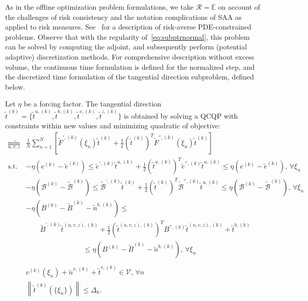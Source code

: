 \documentclass{article}
\newcommand{\1}{\mathds{1}}          %
\theoremstyle{definition}
\begin{document}
\begin{sloppypar}
As in the offline optimization problem formulations, we take $\mathcal{R}=\mathbb{E}$ on account of the challenges of risk consistency and the notation complications of SAA as applied to risk measures. See~\cite{kouri2016risk} for a description of risk-averse PDE-constrained problems. Observe that with the regularity of~\eqref{eq:subptrnormal}, this problem can be solved by computing the adjoint, and subsequently perform (potential adaptive) discretization methods. For comprehensive description without excess volume, the continuous time formulation is defined for the normalized step, and the discretized time formulation of the tangential direction subproblem, defined below.


Let $\eta$ be a forcing factor.
The tangential direction $\tilde{t}^{(k)}=\{\tilde t^{u,(k)},\tilde t^{b,(k)},\tilde t^{v,(k)},\tilde t^{z,(k)}\}$ is obtained by solving a QCQP with constraints within new values and minimizing quadratic of objective:
\begin{equation}\label{eq:subptrtangential}
    \begin{array}{rl}
\min\limits_{u,v,z} & \frac{1}{N}\sum\limits_{n=1}^N \left[\tilde{F}^{',(k)}(\xi_n)\tilde{t}^{(k)}+\frac{1}{2}\left(\tilde{t}^{(k)}\right)^T\tilde{F}^{'',(k)}(\xi_n) \tilde{t}^{(k)}\right]
\\
\text{s.t. } & -\eta (e^{(k)}-\tilde{e}^{(k)})\le \tilde{e}^{',(k)} \tilde{t}^{u,(k)}+\frac{1}{2}\left(\tilde{t}^{u,(k)}\right)^T \tilde{e}^{'',(k)} \tilde{t}^{u,(k)} \le \eta (e^{(k)}-\tilde{e}^{(k)}),\,\forall \xi_n \\
& -\eta (\mathcal{B}^{(k)}-\tilde{\mathcal{B}}^{(k)})\le \tilde{\mathcal{B}}^{',(k)} \tilde{t}^{(k)}+\frac{1}{2}\left(\tilde{t}^{(k)}\right)^T \tilde{\mathcal{B}}^{'',(k)} \tilde{t}^{u,(k)} \le \eta (\mathcal{B}^{(k)}-\tilde{\mathcal{B}}^{(k)}),\,\forall \xi_n \\
& 
-\eta (B^{(k)}-\tilde{B}^{(k)}-\tilde{n}^{b,(k)})\le \\ & \qquad \tilde{B}^{',(k)} \tilde{t}^{(u,v,z),(k)}+\frac{1}{2}\left(\tilde{t}^{(u,v,z),(k)}\right)^T B^{'',(k)} \tilde{t}^{(u,v,z),(k)}+\tilde{t}^{b,(k)} \\ &\qquad\qquad\qquad\qquad  \le \eta (B^{(k)}-\tilde{B}^{(k)}-\tilde{n}^{b,(k)}) ,\,\forall \xi_n \\
\\ & v^{(k)}(\xi_n)+\tilde{n}^{v,(k)}+\tilde{t}^{v,(k)}\in\mathcal{V},\, \forall n \\
& \left\|\tilde{t}^{(k)}(\{\xi_n\})\right\|\le \Delta_k.
\end{array}
\end{equation}



\end{sloppypar}
\end{document}
